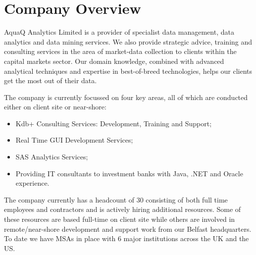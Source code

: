 \chapter{Company Overview}

AquaQ Analytics Limited is a provider of specialist data management, data analytics and data mining services. We also provide strategic advice, training and consulting services in the area of market-data collection to clients within the capital markets sector. Our domain knowledge, combined with advanced analytical techniques and expertise in best-of-breed technologies, helps our clients get the most out of their data.

The company is currently focussed on four key areas, all of which are conducted either on client site or near-shore:
\begin{itemize}
\item Kdb+ Consulting Services: Development, Training and Support;
\item Real Time GUI Development Services;
\item SAS Analytics Services;
\item Providing IT consultants to investment banks with Java, .NET and Oracle experience.
\end{itemize} 

The company currently has a headcount of 30 consisting of both full time employees and contractors and is actively hiring additional resources. Some of these resources are based full-time on client site while others are involved in remote/near-shore development and support work from our Belfast headquarters. To date we have MSAs in place with 6 major institutions across the UK and the US. 
